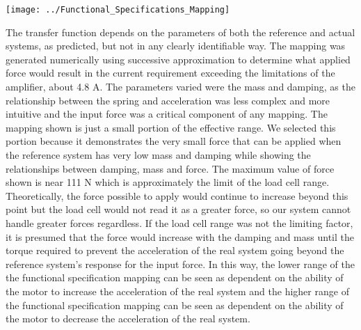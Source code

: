 \begin{figure*}[th]
	\centering
	\texttt{[image: ../Functional\_Specifications\_Mapping]}
	\caption{}
	\label{fig:Functional_Specifications_Mapping}
\end{figure*}
The transfer function depends on the parameters of both the reference and actual systems, as predicted, but not in any clearly identifiable way. The mapping was generated numerically using successive approximation to determine what applied force would result in the current requirement exceeding the limitations of the amplifier, about 4.8 A. The parameters varied were the mass and damping, as the relationship between the spring and acceleration was less complex and more intuitive and the input force was a critical component of any mapping.
The mapping shown is just a small portion of the effective range. We selected this portion because it demonstrates the very small force that can be applied when the reference system has very low mass and damping while showing the relationships between damping, mass and force. The maximum value of force shown is near 111 N which is approximately the limit of the load cell range. Theoretically, the force possible to apply would continue to increase beyond this point but the load cell would not read it as a greater force, so our system cannot handle greater forces regardless. If the load cell range was not the limiting factor, it is presumed that the force would increase with the damping and mass until the torque required to prevent the acceleration of the real system going beyond the reference system's response for the input force. In this way, the lower range of the the functional specification mapping can be seen as dependent on the ability of the motor to increase the acceleration of the real system and the higher range of the functional specification mapping can be seen as dependent on the ability of the motor to decrease the acceleration of the real system.
